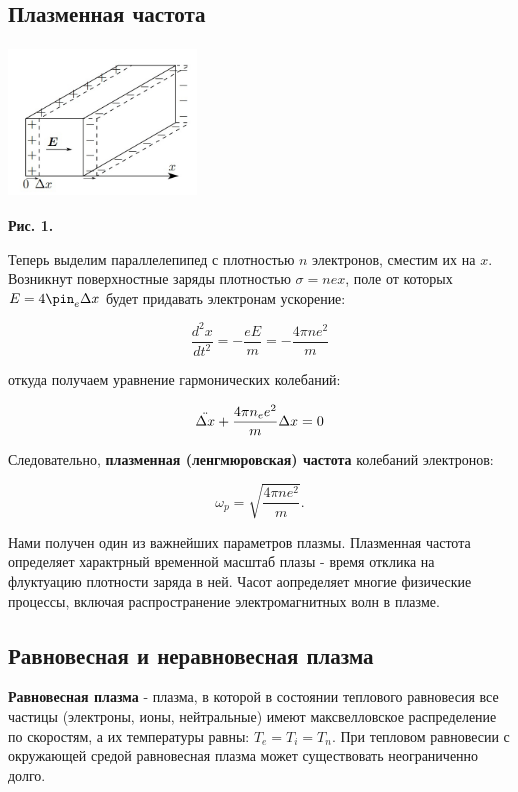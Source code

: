 \documentclass [a4paper, 12pt]{article}
\begin{document}
\subsection*{Плазменная частота}

\begin{center}
\includegraphics[width=5cm, height=4cm]{plch_351.jpg}
\end{center}
\begin{flushright}
{\small \textbf{Рис. 1.} }
\end{flushright}

    Теперь выделим параллелепипед с плотностью $n$ электронов, сместим их на $x$. Возникнут поверхностные заряды плотностью $\sigma = nex$, поле от которых $E = 4\pin_e \Delta x$ будет придавать электронам ускорение:
    
\[
\dfrac{d^2x}{dt^2}=-\dfrac{eE}{m}=-\dfrac{4\pi n e^2}{m}
\]

    откуда получаем уравнение гармонических колебаний:
    
\[\Ddot{\Delta x} + \frac{4 \pi n_e e^2}{m} \Delta x = 0 \]


    Следовательно, \textbf{плазменная (ленгмюровская) частота} колебаний электронов:
    
\begin{equation}
\omega_p = \sqrt{\dfrac{4\pi ne^2}{m}}.
\end{equation}

    Нами получен один из важнейших параметров плазмы. Плазменная частота определяет характрный временной масштаб плазы - время отклика на флуктуацию плотности заряда в ней. Часот аопределяет многие физические процессы, включая распространение электромагнитных волн в плазме.


\subsection*{Равновесная и неравновесная плазма}

    \textbf{Равновесная плазма} - плазма, в которой в состоянии теплового равновесия все частицы (электроны, ионы, нейтральные) имеют максвелловское распределение по скоростям, а их температуры равны: $T_e = T_i = T_n$.
    При тепловом равновесии с окружающей средой равновесная плазма может существовать неограниченно долго.
\end{document}
